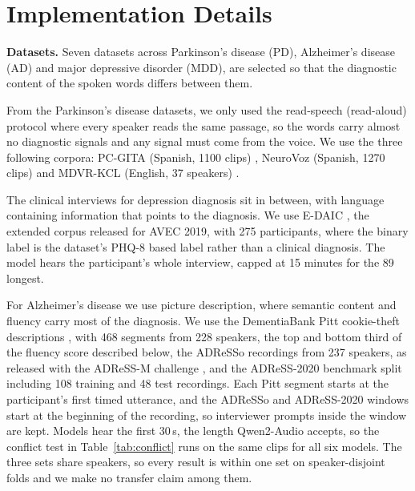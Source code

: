 \documentclass{article}
\begin{document}
\section{Implementation Details}\label{sec:impl}
\noindent\textbf{Datasets.} Seven datasets across Parkinson's disease (PD), Alzheimer's disease (AD) and major depressive disorder (MDD), are selected so that the diagnostic content of the spoken words differs between them. 

From the Parkinson's disease datasets, we only used the read-speech (read-aloud) protocol where every speaker reads the same passage, so the words carry almost no diagnostic signals and any signal must come from the voice. We use the three following corpora: PC-GITA (Spanish, 1100 clips) \cite{pcgita}, NeuroVoz (Spanish, 1270 clips) \cite{neurovoz} and MDVR-KCL (English, 37 speakers) \cite{kcl}.
 
The clinical interviews for depression diagnosis sit in between, with language containing information that points to the diagnosis. We use E-DAIC \cite{daic}, the extended corpus released for AVEC 2019, with 275 participants, where the binary label is the dataset's PHQ-8 \cite{Kroenke2009} based label rather than a clinical diagnosis.  The model hears the participant's whole interview, capped at 15 minutes for the 89 longest.
 
For Alzheimer's disease we use picture description, where semantic content and fluency carry most of the diagnosis. We use the DementiaBank Pitt cookie-theft descriptions \cite{pitt}, with 468 segments from 228 speakers, the top and bottom third of the fluency score described below, the ADReSSo recordings \cite{adresso} from 237 speakers, as released with the ADReSS-M challenge \cite{adressm}, and the ADReSS-2020 benchmark split \cite{adress2020} including 108 training and 48 test recordings. Each Pitt segment starts at the participant's first timed utterance, and the ADReSSo and ADReSS-2020 windows start at the beginning of the recording, so interviewer prompts inside the window are kept. Models hear the first 30\,s, the length Qwen2-Audio accepts, so the conflict test in Table~\ref{tab:conflict} runs on the same clips for all six models. The three sets share speakers, so every result is within one set on speaker-disjoint folds and we make no transfer claim among them.
 
 
\end{document}
